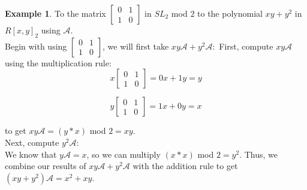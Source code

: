 \documentclass[a4paper,draft]{amsproc}
\theoremstyle{plain}
\theoremstyle{definition}
\newtheorem{exm}{Example}[section]
\theoremstyle{remark}
\numberwithin{equation}{section}
\begin{document}
\begin{exm}To the matrix 
$\begin{bmatrix}
 0&1 \\ 
 1&0 
\end{bmatrix}$ in $SL_{2}$ mod $2$ to the polynomial $xy + y^{2}$ in $R[x,y]_{2}$ using $\mathcal{A}.$ \\ 
Begin with using $\begin{bmatrix}
 0&1 \\ 
 1&0 
\end{bmatrix}$, we will first take $xy\mathcal{A} + y^{2}\mathcal{A}:$ 
First, compute $xy\mathcal{A}$ using the multiplication rule: \\
$$x\begin{bmatrix}
 0&1 \\ 
 1&0 
\end{bmatrix} = 0x + 1y = y$$

$$y\begin{bmatrix}
 0&1 \\ 
 1&0 
\end{bmatrix} = 1x + 0y = x$$

to get  $xy\mathcal{A} = (y*x)$ mod $2 = xy$. \\

Next, compute $y^{2}\mathcal{A}$: \\
We know that $y\mathcal{A} = x$, so we can multiply $(x*x)$ mod $2 = y^{2}$. 
Thus, we combine our results of $xy\mathcal{A} + y^{2}\mathcal{A}$ with the addition rule to get $(xy + y^{2})\mathcal{A} = x^{2} + xy$. 

\end{exm}
\end{document}

